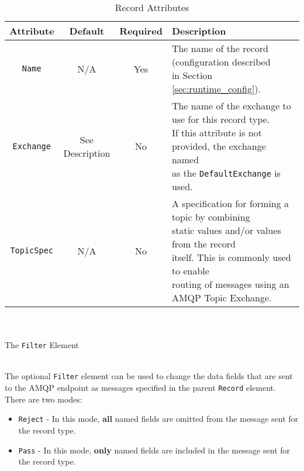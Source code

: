 \begin{table}[h]
    \caption{Record Attributes}        
    \begin{tabularx}{\textwidth}{cccl}
        \toprule
        \textbf{Attribute} & \textbf{Default} & \textbf{Required} & \textbf{Description}\\
        \midrule
        \texttt{Name} & N/A & Yes & \makecell[l]{The name of the record (configuration described\\
        in Section \ref{sec:runtime_config}).\\
        }\\
        \midrule
        \texttt{Exchange} & \makecell[c]{See\\Description} & No & \makecell[l]{The name of the exchange to use for this record type.\\
        If this attribute is not provided, the exchange named\\
        as the \texttt{DefaultExchange} is used.\\
        }\\
        \midrule
        \texttt{TopicSpec} & N/A & No & \makecell[l]{A specification for forming a topic by combining\\
        static values and/or values from the record\\
        itself. This is commonly used to enable\\
        routing of messages using an AMQP Topic Exchange.\\
        }\\
        \bottomrule
    \end{tabularx}
\end{table}



\par{\noindent\\\\The \texttt{Filter} Element}


\noindent\\The optional \texttt{Filter} element can be used to change the data fields that are sent to the AMQP endpoint
as messages specified in the parent \texttt{Record} element. There are two modes:


\begin{itemize}
    \item \texttt{Reject} - In this mode, \textbf{all} named fields are omitted from the message sent for the record type.
    \item \texttt{Pass} - In this mode, \textbf{only} named fields are included in the message sent for the record type.
\end{itemize}

